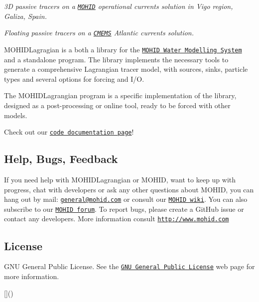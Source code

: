 

{\itshape 3D passive tracers on a \href{http://www.mohid.com}{\tt M\+O\+H\+ID} operational currents solution in Vigo region, Galiza, Spain.}



{\itshape Floating passive tracers on a \href{http://marine.copernicus.eu/}{\tt C\+M\+E\+MS} Atlantic currents solution.}

M\+O\+H\+I\+D\+Lagragian is a both a library for the \href{http://www.mohid.com}{\tt M\+O\+H\+ID Water Modelling System} and a standalone program. The library implements the necessary tools to generate a comprehensive Lagrangian tracer model, with sources, sinks, particle types and several options for forcing and I/O.

The M\+O\+H\+I\+D\+Lagrangian program is a specific implementation of the library, designed as a post-\/processing or online tool, ready to be forced with other models.

Check out our \href{https://rbcanelas.github.io/MOHID-Lagrangian/}{\tt code documentation page}!

\subsection*{Help, Bugs, Feedback}

If you need help with M\+O\+H\+I\+D\+Lagrangian or M\+O\+H\+ID, want to keep up with progress, chat with developers or ask any other questions about M\+O\+H\+ID, you can hang out by mail\+: \href{mailto:general@mohid.com}{\tt general@mohid.\+com} or consult our \href{http://wiki.mohid.com}{\tt M\+O\+H\+ID wiki}. You can also subscribe to our \href{http://forum.mohid.com}{\tt M\+O\+H\+ID forum}. To report bugs, please create a Git\+Hub issue or contact any developers. More information consult \href{http://www.mohid.com}{\tt http\+://www.\+mohid.\+com}

\subsection*{License}

G\+NU General Public License. See the \href{http://www.gnu.org/copyleft/gpl.html}{\tt G\+NU General Public License} web page for more information.

\mbox{[}\mbox{]}() 